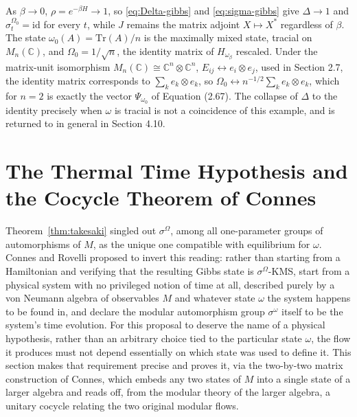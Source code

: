\begin{remark}
	As $\beta \to 0$, $\rho = e^{-\beta H} \to 1$, so \eqref{eq:Delta-gibbs} and \eqref{eq:sigma-gibbs} give $\Delta \to 1$ and $\sigma_t^{\Omega_0} = \mathrm{id}$ for every $t$, while $J$ remains the matrix adjoint $X \mapsto X^*$ regardless of $\beta$. The state $\omega_0(A) = \mathrm{Tr}(A)/n$ is the maximally mixed state, tracial on $M_n(\mathbb{C})$, and $\Omega_0 = 1/\sqrt{n}$, the identity matrix of $H_{\omega_\beta}$ rescaled. Under the matrix-unit isomorphism $M_n(\mathbb{C}) \cong \mathbb{C}^n \otimes \mathbb{C}^n$, $E_{ij} \leftrightarrow e_i \otimes e_j$, used in Section 2.7, the identity matrix corresponds to $\sum_k e_k \otimes e_k$, so $\Omega_0 \leftrightarrow n^{-1/2}\sum_k e_k \otimes e_k$, which for $n=2$ is exactly the vector $\Psi_{\omega_0}$ of Equation (2.67). The collapse of $\Delta$ to the identity precisely when $\omega$ is tracial is not a coincidence of this example, and is returned to in general in Section 4.10.
\end{remark}

\section{The Thermal Time Hypothesis and the Cocycle Theorem of Connes}\label{sec:thermal-time}

Theorem~\ref{thm:takesaki} singled out $\sigma^\Omega$, among all one-parameter groups of automorphisms of $M$, as the unique one compatible with equilibrium for $\omega$. Connes and Rovelli proposed to invert this reading: rather than starting from a Hamiltonian and verifying that the resulting Gibbs state is $\sigma^\Omega$-KMS, start from a physical system with no privileged notion of time at all, described purely by a von Neumann algebra of observables $M$ and whatever state $\omega$ the system happens to be found in, and declare the modular automorphism group $\sigma^\omega$ itself to be the system's time evolution. For this proposal to deserve the name of a physical hypothesis, rather than an arbitrary choice tied to the particular state $\omega$, the flow it produces must not depend essentially on which state was used to define it. This section makes that requirement precise and proves it, via the two-by-two matrix construction of Connes, which embeds any two states of $M$ into a single state of a larger algebra and reads off, from the modular theory of the larger algebra, a unitary cocycle relating the two original modular flows.

